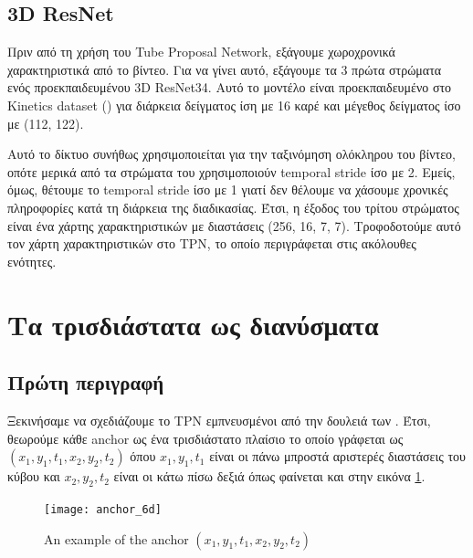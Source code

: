 \subsection{\en 3D ResNet \gr}
Πριν από τη χρήση του \en Tube Proposal Network\gr, εξάγουμε  χωροχρονικά χαρακτηριστικά από το βίντεο. Για να γίνει αυτό, εξάγουμε τα 3 πρώτα στρώματα ενός
προεκπαιδευμένου \en 3D ResNet34\gr. Αυτό το μοντέλο είναι προεκπαιδευμένο στο \en Kinetics dataset (\cite{DBLP:journals/corr/KayCSZHVVGBNSZ17}\gr) για διάρκεια δείγματος ίση με
16 καρέ και μέγεθος δείγματος ίσο με (112, 122).  \par
Αυτό το δίκτυο συνήθως χρησιμοποιείται για την ταξινόμηση ολόκληρου του βίντεο, οπότε μερικά από τα στρώματα του χρησιμοποιούν \en temporal stride \gr ίσο με 2.
Εμείς, όμως, θέτουμε το \en temporal stride \gr ίσο με 1 γιατί δεν θέλουμε να χάσουμε χρονικές πληροφορίες κατά τη διάρκεια της διαδικασίας.
Έτσι, η έξοδος του τρίτου στρώματος είναι ένα χάρτης χαρακτηριστικών με διαστάσεις (256, 16, 7, 7). Τροφοδοτούμε αυτό τον χάρτη  χαρακτηριστικών στο \en TPN\gr,
το οποίο περιγράφεται στις ακόλουθες ενότητες.

\section{Τα τρισδιάστατα   ως   διανύσματα}
\subsection{Πρώτη περιγραφή}
Ξεκινήσαμε να σχεδιάζουμε το \en TPN  \gr εμπνευσμένοι από την δουλειά των \en\cite{DBLP:journals/corr/HouCS17}\gr. Έτσι, θεωρούμε κάθε \en anchor \gr ως ένα
τρισδιάστατο πλαίσιο  το οποίο γράφεται ως \en $(x_1, y_1, t_1, x_2, y_2, t_2)$ \gr  όπου \en $x_1, y_1, t_1$ \gr  είναι
οι πάνω μπροστά αριστερές διαστάσεις του κύβου και \en $x_2, y_2, t_2$ \gr  είναι οι κάτω πίσω δεξιά όπως φαίνεται και στην εικόνα \ref{fig:gr_anchor_6d}.

\begin{figure}[h]
  \centering
  \texttt{[image: anchor\_6d]}
  \caption{\en An example of the anchor $(x_1,y_1,t_1,x_2,y_2,t_2)$}
  \label{fig:gr_anchor_6d}
\end{figure}

